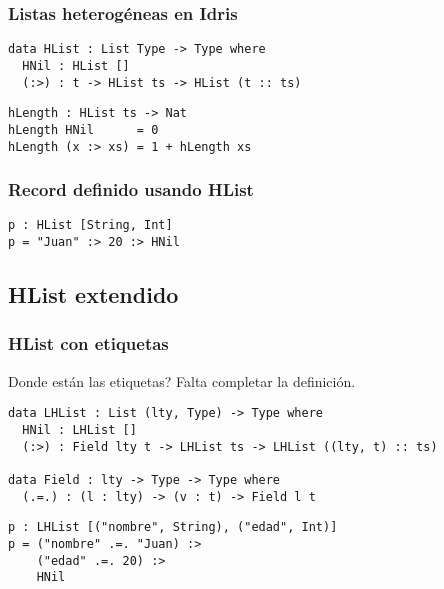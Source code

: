 \documentclass{beamer}
\begin{document}
\begin{frame}[fragile]
\frametitle{Listas heterogéneas en Idris}

\begin{definition}
\begin{verbatim}
data HList : List Type -> Type where
  HNil : HList []
  (:>) : t -> HList ts -> HList (t :: ts)
\end{verbatim}
\end{definition}

\pause

\begin{definition}
\begin{verbatim}
hLength : HList ts -> Nat
hLength HNil      = 0
hLength (x :> xs) = 1 + hLength xs
\end{verbatim}
\end{definition}

\end{frame}

\begin{frame}[fragile]
\frametitle{Record definido usando HList}

\begin{example}
\begin{verbatim}
p : HList [String, Int]
p = "Juan" :> 20 :> HNil
\end{verbatim}
\end{example}

\end{frame}

\subsection{HList extendido}

\begin{frame}[fragile]
\frametitle{HList con etiquetas}

Donde están las etiquetas? Falta completar la definición.

\pause

\begin{definition}
\begin{verbatim}
data LHList : List (lty, Type) -> Type where
  HNil : LHList []
  (:>) : Field lty t -> LHList ts -> LHList ((lty, t) :: ts)

data Field : lty -> Type -> Type where
  (.=.) : (l : lty) -> (v : t) -> Field l t
\end{verbatim}
\end{definition}

\pause

\begin{example}
\begin{verbatim}
p : LHList [("nombre", String), ("edad", Int)]
p = ("nombre" .=. "Juan) :> 
    ("edad" .=. 20) :> 
    HNil
\end{verbatim}
\end{example}

\end{frame}
\end{document}
